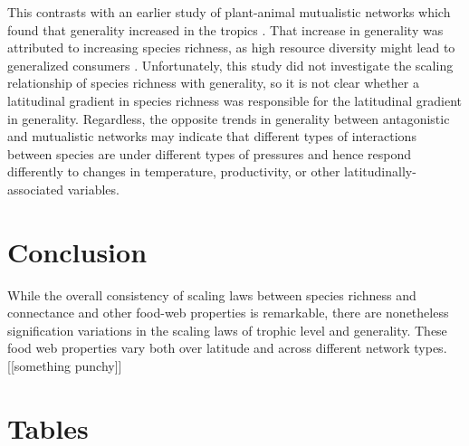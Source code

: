\documentclass[12pt]{article}
\begin{document}
This contrasts with an earlier study of plant-animal mutualistic networks which found that generality increased in the tropics
\citep{Schleuning2012}. That increase in generality was attributed to increasing species richness, as high resource diversity 
might lead to generalized consumers \citep{Schleuning2012}. Unfortunately, this study did not investigate the scaling 
relationship of species richness with generality, so it is not clear whether a latitudinal gradient in species richness was 
responsible for the latitudinal gradient in generality. Regardless, the opposite trends in generality between antagonistic 
and mutualistic networks may indicate that different types of interactions between species are under different types of pressures
and hence respond differently to changes in temperature, productivity, or other latitudinally-associated variables.




\section*{Conclusion}

While the overall consistency of scaling laws between species richness and connectance and other food-web properties is 
remarkable, there are nonetheless signification variations in the scaling laws of trophic level and generality. These food web 
properties vary both over latitude and across different network types. [[something punchy]]

\newpage

\section*{Tables}
\end{document}
